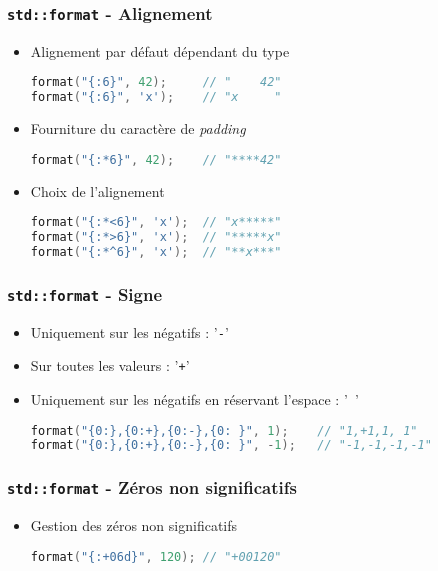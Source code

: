 \documentclass[C++.tex]{subfiles}
\begin{document}
\begin{frame}[fragile]
	\frametitle{\lstinline|std::format| - Alignement}
	\begin{itemize}
		\item Alignement par défaut dépendant du type

			\begin{lstlisting}[language=C++]
format("{:6}", 42);    	// "    42"
format("{:6}", 'x');   	// "x     "\end{lstlisting}

		\item Fourniture du caractère de \textit{padding}

			\begin{lstlisting}[language=C++]
format("{:*6}", 42);    // "****42"\end{lstlisting}

		\item Choix de l'alignement

			\begin{lstlisting}[language=C++]
format("{:*<6}", 'x'); 	// "x*****"
format("{:*>6}", 'x'); 	// "*****x"
format("{:*^6}", 'x'); 	// "**x***"\end{lstlisting}
	\end{itemize}
\end{frame}

\begin{frame}[fragile]
	\frametitle{\lstinline|std::format| - Signe}
	\begin{itemize}
		\item Uniquement sur les négatifs : '\lstinline|-|'


		\item Sur toutes les valeurs : '\lstinline|+|'
		\item Uniquement sur les négatifs en réservant l'espace : '\lstinline| |'

		\begin{lstlisting}[language=C++]
format("{0:},{0:+},{0:-},{0: }", 1); 	// "1,+1,1, 1"
format("{0:},{0:+},{0:-},{0: }", -1);	// "-1,-1,-1,-1"\end{lstlisting}
	\end{itemize}
\end{frame}

\begin{frame}[fragile]
	\frametitle{\lstinline|std::format| - Zéros non significatifs}
	\begin{itemize}
		\item Gestion des zéros non significatifs

		\begin{lstlisting}[language=C++]
format("{:+06d}", 120);	// "+00120"\end{lstlisting}
	\end{itemize}
\end{frame}
\end{document}
